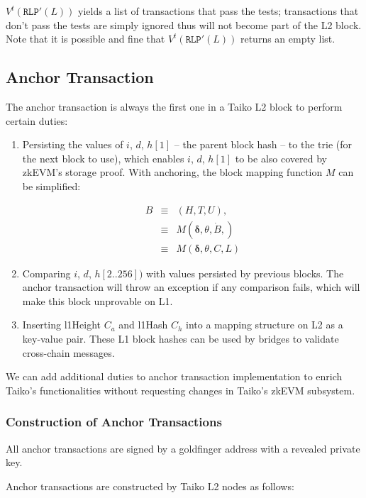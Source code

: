 \documentclass[9pt,oneside]{amsart}
\begin{document}
\begin{multicols}{2}
$V^t(\texttt{RLP}'(L))$ yields a list of transactions that pass the tests; transactions that don't pass the tests are simply ignored thus will not become part of the L2 block. Note that it is possible and fine that $V^t(\texttt{RLP}'(L))$ returns an empty list.


\subsection{Anchor Transaction} \label{sec:anchoring}

The anchor transaction is always the first one in a Taiko L2 block to perform certain duties:

\begin{enumerate}
\item Persisting the values of $i$, $d$, $h[1]$ -- the parent block hash -- to the trie (for the next block to use), which enables $i$, $d$, $h[1]$ to be also covered by  zkEVM's storage proof.   With anchoring, the block mapping function $M$  can be simplified:

\begin{eqnarray}
B & \equiv & (H, T, U), \\
\nonumber & \equiv &  M(\boldsymbol{\delta}, \theta, \dot{B}, )  \\
\nonumber & \equiv & M(\boldsymbol{\delta},  \theta, C, L)
\end{eqnarray}

\item Comparing $i$, $d$, $h[2..256])$ with values persisted by previous blocks. The anchor transaction will throw an exception if any comparison fails, which will make this block unprovable on L1.
\item Inserting l1Height $C_a$ and l1Hash $C_h$ into a mapping structure on L2 as a key-value pair. These L1 block hashes can be used by bridges to validate cross-chain messages.
\end{enumerate}

We can add additional duties to anchor transaction implementation to enrich Taiko's functionalities without requesting changes in Taiko's zkEVM subsystem.

\subsubsection{Construction of Anchor Transactions} All anchor transactions are signed by a goldfinger address with a revealed private key. 

Anchor transactions are constructed by Taiko L2 nodes as follows:


\end{multicols}
\end{document}

